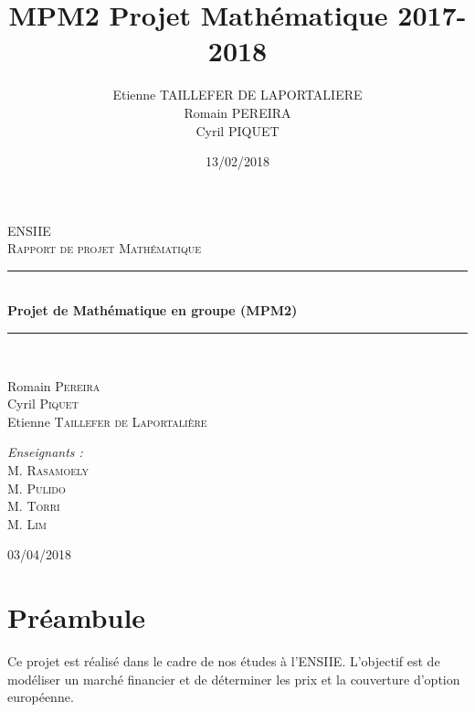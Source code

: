 \documentclass[10pt]{article}
\title{MPM2 Projet Mathématique 2017-2018}
\author{
  Etienne TAILLEFER DE LAPORTALIERE \\
  Romain PEREIRA\\
  Cyril PIQUET
}
\date{13/02/2018}
\newcommand{\HRule}{\rule{\linewidth}{0.5mm}}
\begin{document}
  
  \begin{titlepage}
    \begin{sffamily}
      \begin{center}
	
	\textsc{\LARGE ENSIIE}\\[2cm]
	\textsc{\Large Rapport de projet Mathématique}\\[1.5cm]
	\HRule \\[0.4cm]
	{ \huge \bfseries Projet de Mathématique en groupe (MPM2)\\[0.4cm] }
	\HRule \\[2cm]
	
	\begin{minipage}{0.4\textwidth}
	  \begin{flushleft} \large
	    Romain \textsc{Pereira}\\
	    Cyril \textsc{Piquet}\\
	    Etienne \textsc{Taillefer de Laportalière}\\
	  \end{flushleft}
	\end{minipage}
	\begin{minipage}{0.4\textwidth}
	  \begin{flushright} \large
	    \emph{Enseignants :} \\
	    M. \textsc{Rasamoely}\\
	    M. \textsc{Pulido}\\
	    M. \textsc{Torri}\\
	    M. \textsc{Lim}\\
	  \end{flushright}
	\end{minipage}
	
	\vfill
	{\large 03/04/2018}
      \end{center}
    \end{sffamily}
  \end{titlepage}
  \maketitle
  \tableofcontents
  
  \section*{Préambule}
  Ce projet est réalisé dans le cadre de nos études à l'ENSIIE.
  L'objectif est de modéliser un marché financier et de déterminer les prix et la couverture d'option européenne.
  \newpage
\end{document}
